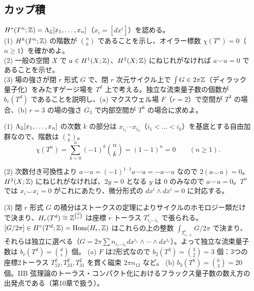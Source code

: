 \subsection{カップ積}

\begin{problem}[難易度 A]\label{ch06-prob-tn}
$H^*(T^n;\mathbb{Z})=\Lambda_{\mathbb{Z}}[x_1,\dots,x_n]$（$x_i=[dx^i]$）を認める。\\
(1) $H^k(T^n;\mathbb{Z})$ の階数が $\binom nk$ であることを示し、オイラー標数 $\chi(T^n)=0$（$n\ge1$）を確かめよ。\\
(2) 一般の空間 $X$ で $a\in H^1(X;\mathbb{Z})$、$H^2(X;\mathbb{Z})$ にねじれがなければ $a\smile a=0$ であることを示せ。\\
(3) 場の強さが閉 $r$ 形式 $G$ で、閉 $r$ 次元サイクル上で $\int G\in2\pi\mathbb{Z}$（ディラック量子化）をみたすゲージ場を $T^d$ 上で考える。独立な流束量子数の個数が $b_r(T^d)$ であることを説明し、(a) マクスウェル場 $F$（$r=2$）で空間が $T^3$ の場合、(b) $r=3$ の場の強さ $G_3$ で内部空間が $T^6$ の場合に求めよ。
\end{problem}

\begin{solution}
(1) $\Lambda_{\mathbb{Z}}[x_1,\dots,x_n]$ の次数 $k$ の部分は $x_{i_1}\cdots x_{i_k}$（$i_1<\dots<i_k$）を基底とする自由加群なので、階数は $\binom nk$。
\[
\chi(T^n)=\sum_{k=0}^n(-1)^k\binom nk=(1-1)^n=0\qquad(n\ge1).
\]

(2) 次数付き可換性より $a\smile a=(-1)^{1\cdot1}a\smile a=-a\smile a$ なので $2(a\smile a)=0$。$H^2(X;\mathbb{Z})$ にねじれがなければ、$2y=0$ となる $y$ は $0$ のみなので $a\smile a=0$。$T^n$ では $x_i\smile x_i=0$ がこれにあたり、微分形式の $dx^i\wedge dx^i=0$ に対応する。

(3) 閉 $r$ 形式 $G$ の積分はストークスの定理によりサイクルのホモロジー類だけで決まり、$H_r(T^d)\cong\mathbb{Z}^{\binom dr}$ は座標 $r$ トーラス $T^r_{i_1\cdots i_r}$ で張られる。$[G/2\pi]\in H^r(T^d;\mathbb{Z})=\operatorname{Hom}(H_r,\mathbb{Z})$ はこれらの上の整数 $\int_{T^r_{i_1\cdots i_r}}G/2\pi$ で決まり、それらは独立に選べる（$G=2\pi\sum n_{i_1\cdots i_r}dx^{i_1}\wedge\cdots\wedge dx^{i_r}$）。よって独立な流束量子数は $b_r(T^d)=\binom dr$ 個。
(a) $F$ は2形式なので $b_2(T^3)=\binom32=3$ 個：3つの座標2トーラス $T^2_{12},T^2_{23},T^2_{31}$ を貫く磁束 $2\pi n_{12}$ など。
(b) $b_3(T^6)=\binom63=20$ 個。IIB 弦理論のトーラス・コンパクト化におけるフラックス量子数の数え方の出発点である（第10章で扱う）。
\end{solution}

